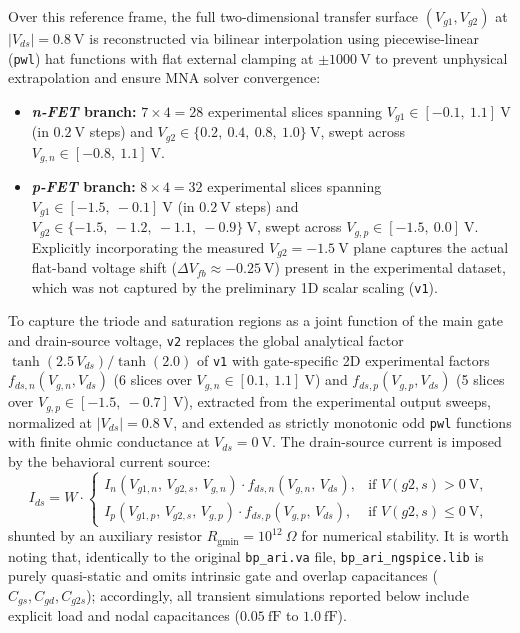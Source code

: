 Over this reference frame, the full two-dimensional transfer surface $(V_{g1}, V_{g2})$ at $|V_{ds}| = 0.8\ \text{V}$ is reconstructed via bilinear interpolation using piecewise-linear (\texttt{pwl}) hat functions with flat external clamping at $\pm 1000\ \text{V}$ to prevent unphysical extrapolation and ensure MNA solver convergence:
\begin{itemize}
    \item \textbf{\textit{n-FET} branch:} $7 \times 4 = 28$ experimental slices spanning $V_{g1} \in [-0.1,\ 1.1]\ \text{V}$ (in $0.2\ \text{V}$ steps) and $V_{g2} \in \{0.2,\allowbreak\ 0.4,\allowbreak\ 0.8,\allowbreak\ 1.0\}\ \text{V}$, swept across $V_{g,n} \in [-0.8,\ 1.1]\ \text{V}$.
    \item \textbf{\textit{p-FET} branch:} $8 \times 4 = 32$ experimental slices spanning $V_{g1} \in [-1.5,\ -0.1]\ \text{V}$ (in $0.2\ \text{V}$ steps) and $V_{g2} \in \{-1.5,\allowbreak\ -1.2,\allowbreak\ -1.1,\allowbreak\ -0.9\}\ \text{V}$, swept across $V_{g,p} \in [-1.5,\ 0.0]\ \text{V}$. Explicitly incorporating the measured $V_{g2} = -1.5\ \text{V}$ plane captures the actual flat-band voltage shift ($\Delta V_{fb} \approx -0.25\ \text{V}$) present in the experimental dataset, which was not captured by the preliminary 1D scalar scaling (\texttt{v1}).
\end{itemize}

To capture the triode and saturation regions as a joint function of the main gate and drain-source voltage, \texttt{v2} replaces the global analytical factor $\tanh(2.5\,V_{ds})/\tanh(2.0)$ of \texttt{v1} with gate-specific 2D experimental factors $f_{ds,n}(V_{g,n}, V_{ds})$ (6 slices over $V_{g,n} \in [0.1,\ 1.1]\ \text{V}$) and $f_{ds,p}(V_{g,p}, V_{ds})$ (5 slices over $V_{g,p} \in [-1.5,\ -0.7]\ \text{V}$), extracted from the experimental output sweeps, normalized at $|V_{ds}| = 0.8\ \text{V}$, and extended as strictly monotonic odd \texttt{pwl} functions with finite ohmic conductance at $V_{ds} = 0\ \text{V}$. The drain-source current is imposed by the behavioral current source:
\begin{equation}\label{eq:bp_current}
I_{ds} = W \cdot \begin{cases}
I_n(V_{g1,n},\, V_{g2,s},\, V_{g,n}) \cdot f_{ds,n}(V_{g,n},\, V_{ds}), & \text{if } V(g2,s) > 0\ \text{V}, \\
I_p(V_{g1,p},\, V_{g2,s},\, V_{g,p}) \cdot f_{ds,p}(V_{g,p},\, V_{ds}), & \text{if } V(g2,s) \le 0\ \text{V},
\end{cases}
\end{equation}
shunted by an auxiliary resistor $R_{\mathrm{gmin}} = 10^{12}\ \Omega$ for numerical stability. It is worth noting that, identically to the original \texttt{bp\_ari.va} file, \texttt{bp\_ari\_ngspice.lib} is purely quasi-static and omits intrinsic gate and overlap capacitances ($C_{gs}, C_{gd}, C_{g2s}$); accordingly, all transient simulations reported below include explicit load and nodal capacitances ($0.05\ \text{fF}$ to $1.0\ \text{fF}$).

